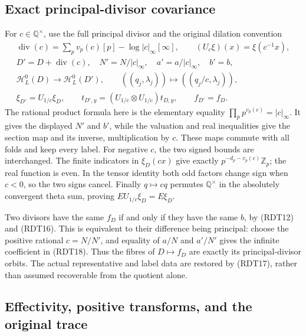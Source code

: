 \subsection{Exact principal-divisor covariance}

For $c\in\mathbb Q^\times$, use the full principal divisor and
the original dilation convention
\begin{equation}\tag{RDT18}
\begin{gathered}
\operatorname{div}(c)=\sum_pv_p(c)[p]-\log|c|_\infty[\infty],
\qquad (U_c\xi)(x)=\xi(c^{-1}x),\\
D'=D+\operatorname{div}(c),\quad
N'=N/|c|_\infty,\quad a'=a/|c|_\infty,\quad b'=b,\\
\mathcal H_L^0(D)\longrightarrow\mathcal H_L^0(D'),\qquad
((q_j,\lambda_j))\longmapsto((q_j/c,\lambda_j)),\\
\xi_{D'}=U_{1/c}\xi_D,\qquad
t_{D',y}=(U_{1/c}\otimes U_{1/c})t_{D,y},\qquad f_{D'}=f_D.
\end{gathered}
\end{equation}
The rational product formula here is the elementary equality
$\prod_pp^{v_p(c)}=|c|_\infty$. It gives the displayed $N'$ and
$b'$, while the valuation and real inequalities give the section
map and its inverse, multiplication by $c$. These maps commute with
all folds and keep every label. For negative $c$, the two signed
bounds are interchanged. The finite indicators in $\xi_D(cx)$ give
exactly $p^{-d_p-v_p(c)}\mathbb Z_p$; the real function is even.
In the tensor identity both odd factors change sign when $c<0$,
so the two signs cancel. Finally $q\mapsto cq$ permutes
$\mathbb Q^\times$ in the absolutely convergent theta sum, proving
$EU_{1/c}\xi_D=E\xi_D$.

Two divisors have the same $f_D$ if and only if they have the same
$b$, by (RDT12) and (RDT16). This is equivalent to their difference
being principal: choose the positive rational $c=N/N'$, and equality
of $a/N$ and $a'/N'$ gives the infinite coefficient in (RDT18).
Thus the fibres of $D\mapsto f_D$ are exactly its principal-divisor
orbits. The actual representative and label data are restored by
(RDT17), rather than assumed recoverable from the quotient alone.

\subsection{Effectivity, positive transforms, and the original trace}

